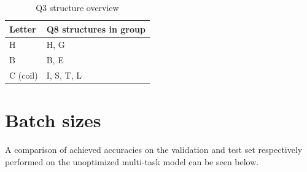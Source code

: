 \begin{table}[H]
\caption{Q3 structure overview}
\centering
\begin{tabular}{l|l}
\hline
Letter		& Q8 structures in group	\\ \hline
H			& H, G						\\
B			& B, E						\\
C (coil)	& I, S, T, L				\\
\end{tabular}
\end{table}

\section*{Batch sizes}
A comparison of achieved accuracies on the validation and test set respectively performed on the unoptimized multi-task model can be seen below.
